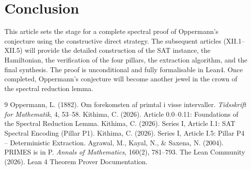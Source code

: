 \documentclass[11pt,a4paper]{article}
\begin{document}
\section{Conclusion}

This article sets the stage for a complete spectral proof of Oppermann's conjecture using the constructive direct strategy. The subsequent articles (XII.1–XII.5) will provide the detailed construction of the SAT instance, the Hamiltonian, the verification of the four pillars, the extraction algorithm, and the final synthesis. The proof is unconditional and fully formalisable in Lean4. Once completed, Oppermann's conjecture will become another jewel in the crown of the spectral reduction lemma.


\begin{thebibliography}{9}
  Oppermann, L. (1882). Om forekomsten af primtal i visse intervaller. \emph{Tidsskrift for Mathematik}, 4, 53–58.
  Kithima, C. (2026). Article 0.0–0.11: Foundations of the Spectral Reduction Lemma.
  Kithima, C. (2026). Series I, Article I.1: SAT Spectral Encoding (Pillar P1).
  Kithima, C. (2026). Series I, Article I.5: Pillar P4 – Deterministic Extraction.
  Agrawal, M., Kayal, N., \& Saxena, N. (2004). PRIMES is in P. \emph{Annals of Mathematics}, 160(2), 781–793.
  The Lean Community (2026). Lean 4 Theorem Prover Documentation.
\end{thebibliography}
\end{document}
